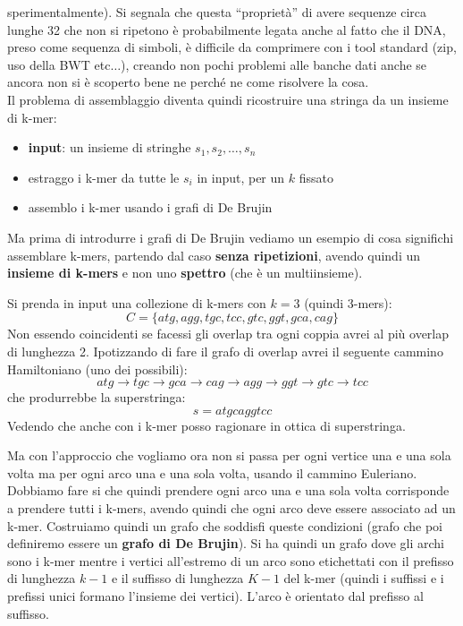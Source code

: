 \documentclass[a4paper,12pt, oneside]{book}
\begin{document}
sperimentalmente). Si segnala che questa ``proprietà'' di avere sequenze circa
lunghe 32 che non si ripetono è probabilmente legata anche al fatto che il DNA,
preso come sequenza di simboli, è difficile da comprimere con i tool standard
(zip, uso della BWT etc$\ldots$), creando non pochi problemi alle banche dati
anche se ancora non si è scoperto bene ne perché ne come risolvere la cosa.\\  
Il problema di assemblaggio diventa quindi ricostruire una stringa da un insieme
di k-mer:
\begin{itemize}
  \item \textbf{input}: un insieme di stringhe $s_1,s_2,\ldots,s_n$
  \item estraggo i k-mer da tutte le $s_i$ in input, per un $k$ fissato
  \item assemblo i k-mer usando i grafi di De Brujin
\end{itemize}
Ma prima di introdurre i grafi di De Brujin vediamo un esempio di cosa
significhi assemblare k-mers, partendo dal caso \textbf{senza ripetizioni},
avendo quindi un \textbf{insieme di k-mers} e non uno \textbf{spettro} (che è un
multiinsieme).
\begin{esempio}
  Si prenda in input una collezione di k-mers con $k=3$ (quindi 3-mers):
  \[C=\{atg, agg, tgc,tcc, gtc, ggt, gca, cag\}\]
  Non essendo coincidenti se facessi gli overlap tra ogni coppia avrei al più
  overlap di lunghezza 2. Ipotizzando di fare il grafo di overlap avrei il
  seguente cammino Hamiltoniano (uno dei possibili):
  \[atg\to tgc\to gca\to cag\to agg\to ggt\to gtc\to tcc\]
  che produrrebbe la superstringa:
  \[s=atgcaggtcc\]
  Vedendo che anche con i k-mer posso ragionare in ottica di superstringa.
\end{esempio}
Ma con l'approccio che vogliamo ora non si passa per ogni vertice una e una
sola volta ma per ogni arco una e una sola volta, usando il cammino
Euleriano.\\
Dobbiamo fare si che quindi prendere ogni arco una e una sola volta
corrisponde a prendere tutti i k-mers, avendo quindi che ogni arco deve essere
associato ad un k-mer. Costruiamo quindi un grafo che soddisfi queste
condizioni (grafo che poi definiremo essere un \textbf{grafo di De
  Brujin}). Si ha quindi un grafo dove gli archi sono i k-mer mentre i vertici
all'estremo di un arco sono etichettati con il prefisso di lunghezza $k-1$ e
il suffisso di lunghezza $K-1$ del
k-mer (quindi i suffissi e i prefissi unici formano l'insieme dei
vertici). L'arco è orientato dal prefisso al suffisso. \\
\end{document}
